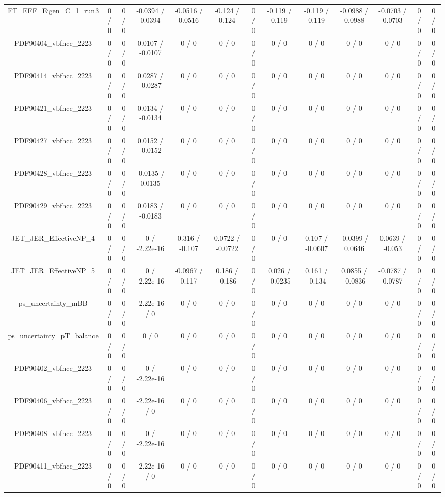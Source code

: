 \documentclass[10pt]{article}
\begin{document}
\begin{table}[htbp]
\begin{center}
\begin{tabular}{|c|c|c|c|c|c|c|c|c|c|c|c|c|}
  FT_EFF_Eigen_C_1_run3 & 0 / 0 & 0 / 0 & -0.0394 / 0.0394 & -0.0516 / 0.0516 & -0.124 / 0.124 & 0 / 0 & -0.119 / 0.119 & -0.119 / 0.119 & -0.0988 / 0.0988 & -0.0703 / 0.0703 & 0 / 0 & 0 / 0 \\ 
  PDF90404_vbfhcc_2223 & 0 / 0 & 0 / 0 & 0.0107 / -0.0107 & 0 / 0 & 0 / 0 & 0 / 0 & 0 / 0 & 0 / 0 & 0 / 0 & 0 / 0 & 0 / 0 & 0 / 0 \\ 
  PDF90414_vbfhcc_2223 & 0 / 0 & 0 / 0 & 0.0287 / -0.0287 & 0 / 0 & 0 / 0 & 0 / 0 & 0 / 0 & 0 / 0 & 0 / 0 & 0 / 0 & 0 / 0 & 0 / 0 \\ 
  PDF90421_vbfhcc_2223 & 0 / 0 & 0 / 0 & 0.0134 / -0.0134 & 0 / 0 & 0 / 0 & 0 / 0 & 0 / 0 & 0 / 0 & 0 / 0 & 0 / 0 & 0 / 0 & 0 / 0 \\ 
  PDF90427_vbfhcc_2223 & 0 / 0 & 0 / 0 & 0.0152 / -0.0152 & 0 / 0 & 0 / 0 & 0 / 0 & 0 / 0 & 0 / 0 & 0 / 0 & 0 / 0 & 0 / 0 & 0 / 0 \\ 
  PDF90428_vbfhcc_2223 & 0 / 0 & 0 / 0 & -0.0135 / 0.0135 & 0 / 0 & 0 / 0 & 0 / 0 & 0 / 0 & 0 / 0 & 0 / 0 & 0 / 0 & 0 / 0 & 0 / 0 \\ 
  PDF90429_vbfhcc_2223 & 0 / 0 & 0 / 0 & 0.0183 / -0.0183 & 0 / 0 & 0 / 0 & 0 / 0 & 0 / 0 & 0 / 0 & 0 / 0 & 0 / 0 & 0 / 0 & 0 / 0 \\ 
  JET_JER_EffectiveNP_4 & 0 / 0 & 0 / 0 & 0 / -2.22e-16 & 0.316 / -0.107 & 0.0722 / -0.0722 & 0 / 0 & 0 / 0 & 0.107 / -0.0607 & -0.0399 / 0.0646 & 0.0639 / -0.053 & 0 / 0 & 0 / 0 \\ 
  JET_JER_EffectiveNP_5 & 0 / 0 & 0 / 0 & 0 / -2.22e-16 & -0.0967 / 0.117 & 0.186 / -0.186 & 0 / 0 & 0.026 / -0.0235 & 0.161 / -0.134 & 0.0855 / -0.0836 & -0.0787 / 0.0787 & 0 / 0 & 0 / 0 \\ 
  ps_uncertainty_mBB & 0 / 0 & 0 / 0 & -2.22e-16 / 0 & 0 / 0 & 0 / 0 & 0 / 0 & 0 / 0 & 0 / 0 & 0 / 0 & 0 / 0 & 0 / 0 & 0 / 0 \\ 
  ps_uncertainty_pT_balance & 0 / 0 & 0 / 0 & 0 / 0 & 0 / 0 & 0 / 0 & 0 / 0 & 0 / 0 & 0 / 0 & 0 / 0 & 0 / 0 & 0 / 0 & 0 / 0 \\ 
  PDF90402_vbfhcc_2223 & 0 / 0 & 0 / 0 & 0 / -2.22e-16 & 0 / 0 & 0 / 0 & 0 / 0 & 0 / 0 & 0 / 0 & 0 / 0 & 0 / 0 & 0 / 0 & 0 / 0 \\ 
  PDF90406_vbfhcc_2223 & 0 / 0 & 0 / 0 & -2.22e-16 / 0 & 0 / 0 & 0 / 0 & 0 / 0 & 0 / 0 & 0 / 0 & 0 / 0 & 0 / 0 & 0 / 0 & 0 / 0 \\ 
  PDF90408_vbfhcc_2223 & 0 / 0 & 0 / 0 & 0 / -2.22e-16 & 0 / 0 & 0 / 0 & 0 / 0 & 0 / 0 & 0 / 0 & 0 / 0 & 0 / 0 & 0 / 0 & 0 / 0 \\ 
  PDF90411_vbfhcc_2223 & 0 / 0 & 0 / 0 & -2.22e-16 / 0 & 0 / 0 & 0 / 0 & 0 / 0 & 0 / 0 & 0 / 0 & 0 / 0 & 0 / 0 & 0 / 0 & 0 / 0 \\ 

\end{tabular}
\end{center}
\end{table}
\end{document}
